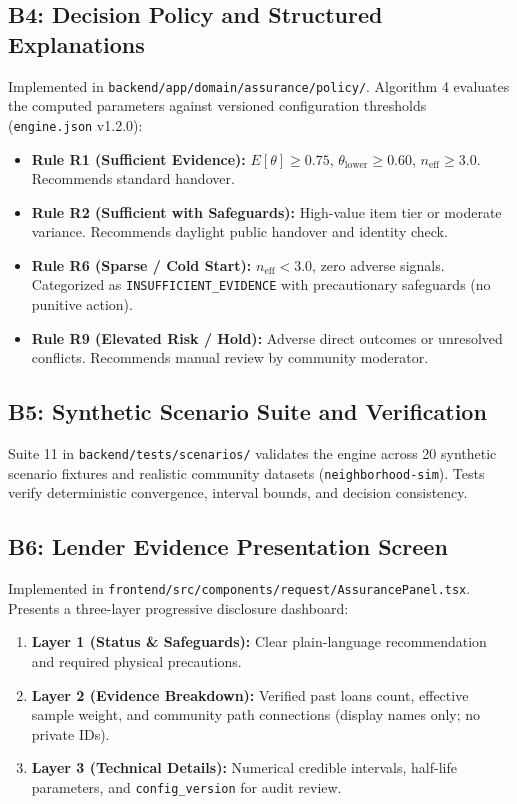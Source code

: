 \subsection{B4: Decision Policy and Structured Explanations}
Implemented in \texttt{backend/app/domain/assurance/policy/}. Algorithm 4 evaluates the computed parameters against versioned configuration thresholds (\texttt{engine.json} v1.2.0):
\begin{itemize}
    \item \textbf{Rule R1 (Sufficient Evidence):} $E[\theta] \ge 0.75$, $\theta_{\text{lower}} \ge 0.60$, $n_{\text{eff}} \ge 3.0$. Recommends standard handover.
    \item \textbf{Rule R2 (Sufficient with Safeguards):} High-value item tier or moderate variance. Recommends daylight public handover and identity check.
    \item \textbf{Rule R6 (Sparse / Cold Start):} $n_{\text{eff}} < 3.0$, zero adverse signals. Categorized as \texttt{INSUFFICIENT\_EVIDENCE} with precautionary safeguards (no punitive action).
    \item \textbf{Rule R9 (Elevated Risk / Hold):} Adverse direct outcomes or unresolved conflicts. Recommends manual review by community moderator.
\end{itemize}

\subsection{B5: Synthetic Scenario Suite and Verification}
Suite 11 in \texttt{backend/tests/scenarios/} validates the engine across 20 synthetic scenario fixtures and realistic community datasets (\texttt{neighborhood-sim}). Tests verify deterministic convergence, interval bounds, and decision consistency.

\subsection{B6: Lender Evidence Presentation Screen}
Implemented in \texttt{frontend/src/components/request/AssurancePanel.tsx}. Presents a three-layer progressive disclosure dashboard:
\begin{enumerate}
    \item \textbf{Layer 1 (Status \& Safeguards):} Clear plain-language recommendation and required physical precautions.
    \item \textbf{Layer 2 (Evidence Breakdown):} Verified past loans count, effective sample weight, and community path connections (display names only; no private IDs).
    \item \textbf{Layer 3 (Technical Details):} Numerical credible intervals, half-life parameters, and \texttt{config\_version} for audit review.
\end{enumerate}

